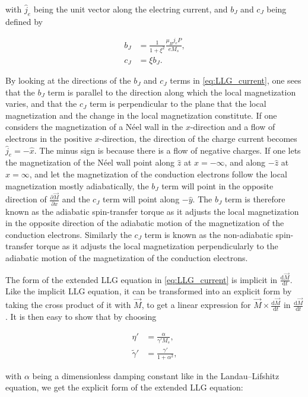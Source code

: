 \documentclass[1p]{elsarticle}		%
\numberwithin{equation}{section}
\begin{document}
with $\hat{j}_e$ being the unit vector along the electring current, and $b_J$ and $c_J$ being defined by

\begin{align}
\label{eq:bJ} b_J &= \frac{1}{1+\xi^2} \frac{\mu_B j_e P}{e M_s}, \\
c_J &= \xi b_J.
\end{align}

By looking at the directions of the $b_J$ and $c_J$ terms in \eqref{eq:LLG_current}, one sees that the $b_J$ term is parallel to the direction along which the local magnetization varies, and that the $c_J$ term is perpendicular to the plane that the local magnetization and the change in the local magnetization constitute. If one considers the magnetization of a N\'{e}el wall in the $x$-direction and a flow of electrons in the positive $x$-direction, the direction of the charge current becomes $\hat{j}_e = -\hat{x}$. The minus sign is because there is a flow of negative charges. If one lets the magnetization of the N\'{e}el wall point along $\hat{z}$ at $x = -\infty$, and along $-\hat{z}$ at $x = \infty$, and let the magnetization of the conduction electrons follow the local magnetization mostly adiabatically, the $b_J$ term will point in the opposite direction of $\frac{\partial \vec{M}}{\partial x}$ and the $c_J$ term will point along $-\hat{y}$. The $b_J$ term is therefore known as the adiabatic spin-transfer torque as it adjusts the local magnetization in the opposite direction of the adiabatic motion of the magnetization of the conduction electrons. Similarly the $c_J$ term is known as the non-adiabatic spin-transfer torque as it adjusts the local magnetization perpendicularly to the adiabatic motion of the magnetization of the conduction electrons. 

The form of the extended LLG equation in \eqref{eq:LLG_current} is implicit in $\frac{\textrm{d} \vec{M}}{\textrm{d} t}$. Like the implicit LLG equation, it can be transformed into an explicit form by taking the cross product of it with $\vec{M}$, to get a linear expression for $\vec{M}\times\frac{\textrm{d} \vec{M}}{\textrm{d} t}$ in $\frac{\textrm{d} \vec{M}}{\textrm{d} t}$. It is then easy to show that by choosing

\begin{align}
\eta' &= \frac{\alpha}{\gamma ' M_s}, \\
\tilde{\gamma}' &= \frac{\gamma '}{1+\alpha^2},
\end{align}

with $\alpha$ being a dimensionless damping constant like in the Landau--Lifshitz equation, we get the explicit form of the extended LLG equation:
\end{document}

